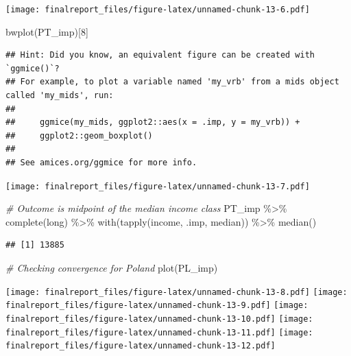 \documentclass[
]{article}
\newenvironment{Shaded}{\begin{snugshade}}{\end{snugshade}}
\newcommand{\CommentTok}[1]{\textcolor[rgb]{0.56,0.35,0.01}{\textit{#1}}}
\newcommand{\DecValTok}[1]{\textcolor[rgb]{0.00,0.00,0.81}{#1}}
\newcommand{\FunctionTok}[1]{\textcolor[rgb]{0.00,0.00,0.00}{#1}}
\newcommand{\NormalTok}[1]{#1}
\newcommand{\SpecialCharTok}[1]{\textcolor[rgb]{0.00,0.00,0.00}{#1}}
\newcommand{\StringTok}[1]{\textcolor[rgb]{0.31,0.60,0.02}{#1}}
\begin{document}
\texttt{[image: finalreport\_files/figure-latex/unnamed-chunk-13-6.pdf]}

\begin{Shaded}
\begin{Highlighting}[]
\FunctionTok{bwplot}\NormalTok{(PT\_imp)[}\DecValTok{8}\NormalTok{]}
\end{Highlighting}
\end{Shaded}

\begin{verbatim}
## Hint: Did you know, an equivalent figure can be created with `ggmice()`?
## For example, to plot a variable named 'my_vrb' from a mids object called 'my_mids', run: 
## 
##     ggmice(my_mids, ggplot2::aes(x = .imp, y = my_vrb)) +
##     ggplot2::geom_boxplot() 
## 
## See amices.org/ggmice for more info.
\end{verbatim}

\texttt{[image: finalreport\_files/figure-latex/unnamed-chunk-13-7.pdf]}

\begin{Shaded}
\begin{Highlighting}[]
\CommentTok{\# Outcome is midpoint of the median income class}
\NormalTok{PT\_imp }\SpecialCharTok{\%\textgreater{}\%} 
  \FunctionTok{complete}\NormalTok{(}\StringTok{\textquotesingle{}long\textquotesingle{}}\NormalTok{) }\SpecialCharTok{\%\textgreater{}\%} 
  \FunctionTok{with}\NormalTok{(}\FunctionTok{tapply}\NormalTok{(income, .imp, median)) }\SpecialCharTok{\%\textgreater{}\%} 
  \FunctionTok{median}\NormalTok{()}
\end{Highlighting}
\end{Shaded}

\begin{verbatim}
## [1] 13885
\end{verbatim}

\begin{Shaded}
\begin{Highlighting}[]
\CommentTok{\# Checking convergence for Poland}
\FunctionTok{plot}\NormalTok{(PL\_imp)}
\end{Highlighting}
\end{Shaded}

\texttt{[image: finalreport\_files/figure-latex/unnamed-chunk-13-8.pdf]}
\texttt{[image: finalreport\_files/figure-latex/unnamed-chunk-13-9.pdf]}
\texttt{[image: finalreport\_files/figure-latex/unnamed-chunk-13-10.pdf]}
\texttt{[image: finalreport\_files/figure-latex/unnamed-chunk-13-11.pdf]}
\texttt{[image: finalreport\_files/figure-latex/unnamed-chunk-13-12.pdf]}
\end{document}
